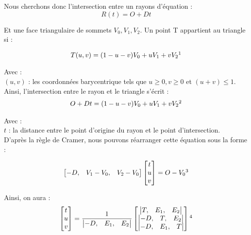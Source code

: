 Nous cherchons donc l'intersection entre un rayons d'équation : 
\begin{equation}
R(t) = O + Dt
\end{equation}

Et une face triangulaire de sommets $ V_0, V_1, V_2$. Un point T appartient au triangle si : 

\begin{equation} \label{eq_2moller}
T(u,v) = (1-u-v)V_0 + uV_1 + vV_2 \footnotemark
\end{equation}

Avec :  \\
$(u,v)$ : les coordonnées barycentrique tels que $u\geqslant0, v\geqslant0$ et $(u+v)\leqslant1$. \\

Ainsi, l'intersection entre le rayon et le triangle s'écrit :
\begin{equation}
O + Dt = (1-u-v)V_0 + uV_1 + vV_2 \footnotemark
\end{equation}

Avec : \\
$t$ : la distance entre le point d'origine du rayon et le point d'intersection. \\

D'après la règle de Cramer, nous pouvons réarranger cette équation sous la forme :


\begin{equation}
	\begin{bmatrix}
 	  -D, & V_1-V_0, & V_2-V_0
	\end{bmatrix}
	\begin{bmatrix}
 	 t \\
	 u \\
	 v
	\end{bmatrix}
	= O-V_0
	\footnotemark
\end{equation}

Ainsi, on aura :
\begin{equation}
	\begin{bmatrix}
 	 t \\
	 u \\
	 v
	\end{bmatrix}
	=
	\frac{1}{
	\begin{vmatrix}
 	  -D, & E_1, & E_2
	\end{vmatrix}
	}
	\begin{bmatrix}
 	 	\begin{vmatrix}
 		  T, & E_1, & E_2
		\end{vmatrix} \\
 	 	\begin{vmatrix}
 		  -D, & T, & E_2
		\end{vmatrix} \\
 	 	\begin{vmatrix}
 		  -D, & E_1, & T
		\end{vmatrix}
	\end{bmatrix}	
	\footnotemark
\end{equation}

